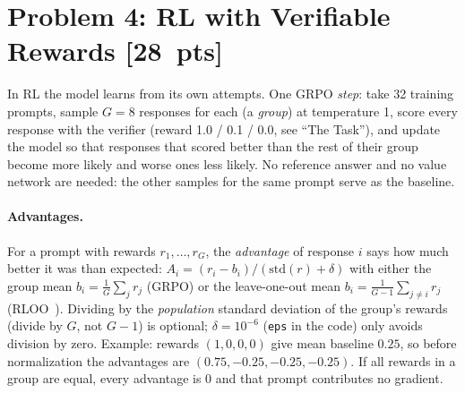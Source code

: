 \documentclass[11pt]{article}
\newcommand{\pts}[1]{\textnormal{[#1~pts]}}
\begin{document}
\section*{Problem 4: RL with Verifiable Rewards \pts{28}}
In RL the model learns from its own attempts. One GRPO \emph{step}: take 32 training prompts, sample $G=8$
responses for each (a \emph{group}) at temperature 1, score every response with the verifier (reward 1.0 /
0.1 / 0.0, see ``The Task''), and update the model so that responses that scored better than the rest of their
group become more likely and worse ones less likely. No reference answer and no value network are needed: the
other samples for the same prompt serve as the baseline.

\paragraph{Advantages.} For a prompt with rewards $r_1,\dots,r_G$, the \emph{advantage} of response $i$ says how
much better it was than expected:
$A_i = (r_i - b_i)/(\mathrm{std}(r) + \delta)$ with either the group mean $b_i = \frac{1}{G}\sum_j r_j$ (GRPO)
or the leave-one-out mean $b_i = \frac{1}{G-1}\sum_{j\neq i} r_j$ (RLOO~\cite{rloo}). Dividing by the
\emph{population} standard deviation of the group's rewards (divide by $G$, not $G-1$) is optional;
$\delta = 10^{-6}$ (\texttt{eps} in the code) only avoids division by zero. Example: rewards $(1, 0, 0, 0)$ give
mean baseline $0.25$, so before normalization the advantages are $(0.75, -0.25, -0.25, -0.25)$. If all rewards
in a group are equal, every advantage is 0 and that prompt contributes no gradient.
\end{document}
